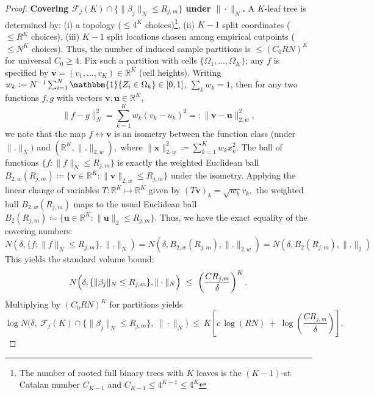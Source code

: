 \documentclass[11pt]{article}
\theoremstyle{plain}
\theoremstyle{definition}
\theoremstyle{plain}
\begin{document}
\begin{proof}
\textbf{Covering $\mathcal F_j(K)\cap\{\|\beta_j\|_N\le R_{j,m}\}$ under $\|\cdot\|_N$.}
A $K$-leaf tree is determined by: (i) a topology ($\le 4^K$ choices)\footnote{The number of rooted full binary trees with $K$ leaves is the $(K-1)$-st Catalan number $C_{K-1}$ and $C_{K-1} \le 4^{K-1} \le 4^K$}, (ii) $K-1$ split coordinates ($\le R^K$ choices), (iii) $K-1$ split locations chosen among empirical cutpoints ($\le N^K$ choices). Thus, the number of induced sample partitions is $\le (C_0 RN)^{K}$ for universal $C_0 \ge 4$. Fix such a partition with cells $\{\Omega_1,\dots,\Omega_K\}$; any $f$ is specified by $\bm{v}=(v_1,\dots,v_K)\in\mathbb R^K$ (cell heights). Writing $w_k:=N^{-1}\sum_{i=1}^N\mathbbm{1}\{Z_i\in\Omega_k\}\in[0,1]$, $\sum_k w_k=1$, then for any two functions $f,g$ with vectors $\bm{v},\bm{u} \in \mathbb{R}^{K},$ \[
\|f-g\|_N ^2 = \sum_{k=1}^{K} w_k(v_k-u_k)^2 =: \|\bm{v}-\bm{u}\|_{2,w} ^2, 
\]
we note that the map $f \leftrightarrow \bm{v}$ is an isometry between the function class (under $\|.\|_N)$ and $(\mathbb{R}^K,\|.\|_{2,w}),$ where $\|\bm{x}\|_{2,w} ^2 \coloneqq \sum_{k=1}^{K} w_k x_k ^2.$ The ball of functions $\{f:\|f\|_N \le R_{j,m}\}$ is exactly the weighted Euclidean ball $B_{2,w}(R_{j,m}) \coloneqq \{\bm{v} \in \mathbb{R}^K: \|\bm{v}\|_{2,w} \le R_{j,m}\}$ under the isometry. Applying the linear change of variables $T:\mathbb{R}^{K} \mapsto \mathbb{R}^{K}$ given by $(T \bm{v})_k = \sqrt{w_k}v_k,$ the weighted ball $B_{2,w}(R_{j,m})$ maps to the usual Euclidean ball $B_2 (R_{j,m}) \coloneqq \{\bm{u} \in \mathbb{R}^{K}: \|\bm{u}\|_2 \le R_{j,m}\}.$ Thus, we have the exact equality of the covering numbers: 
\[
N(\delta,\{f:\|f\|_N \le R_{j,m}\},\|.\|_N)=N(\delta,B_{2,w}(R_{j,m}),\|.\|_{2,w})=N(\delta,B_2(R_{j,m}),\|.\|_2)
\]
This yields the standard volume bound:
\[
N\Bigl(\delta,\{\|\beta_j\|_N\le R_{j,m}\},\|\cdot\|_N\Bigr)\ \le\ \left(\frac{C R_{j,m}}{\delta} \right)^K.
\]
Multiplying by $(C_0 RN)^K$ for partitions yields
\begin{equation}\label{eq:perK-entropy}
\log N\bigl(\delta,\ \mathcal F_j(K)\cap\{\|\beta_j\|_N\le R_{j,m}\},\ \|\cdot\|_N\bigr)
\ \le\ K\left[c\,\log(RN)\ +\ \log\left(\frac{C R_{j,m}}{\delta}\right)\right].
\end{equation}


\end{proof}
\end{document}
